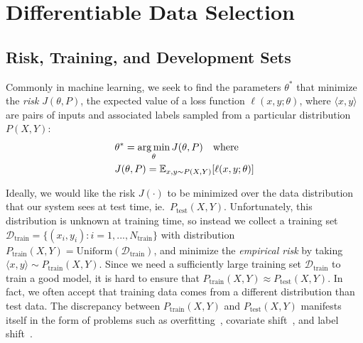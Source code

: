 \section{\label{sec:method} Differentiable Data Selection}

\subsection{\label{sec:dds_motivation}Risk, Training, and Development Sets}

Commonly in machine learning, we seek to find the parameters $\theta^*$ that minimize the \emph{risk} $J(\theta,P)$, the expected value of a loss function $\ell(x, y; \theta)$, where $\langle x, y \rangle$ are pairs of inputs and associated labels sampled from a particular distribution $P(X, Y)$:
\begin{equation}
  \label{eqn:generic_optim}
  \begin{aligned}
   & \theta^* = \operatorname*{arg\,min}_\theta J(\theta, P)
    ~~~\text{where}~~~ \\
   & J(\theta, P) = \mathbb{E}_{x, y \sim P(X, Y)} [\ell(x, y; \theta)]
  \end{aligned}
\end{equation}

Ideally, we would like the risk $J(\cdot)$ to be minimized over the data distribution that our system sees at test time, ie.~$P_{\text{test}}(X,Y)$.
Unfortunately, this distribution is unknown at training time, so instead we collect a training set $\mathcal{D}_\text{train} = \{(x_i, y_i): i = 1, ..., N_\text{train}\}$ with distribution $P_\text{train}(X, Y) = \text{Uniform}(\mathcal{D}_\text{train})$, and minimize the \emph{empirical risk} by taking $\langle x, y \rangle \sim P_\text{train}(X, Y)$.
Since we need a sufficiently large training set $\mathcal{D}_\text{train}$ to train a good model, it is hard to ensure that $P_\text{train}(X, Y) \approx P_{\text{test}}(X, Y)$. In fact, we often accept that training data comes from a different distribution than test data.
The discrepancy between $P_\text{train}(X, Y)$ and $P_\text{test}(X, Y)$ manifests itself in the form of problems such as overfitting~\citep{overfit_random_examples,dropout}, covariate shift~\citep{shimodaira2000improving}, and label shift~\citep{lipton2018detecting}.

